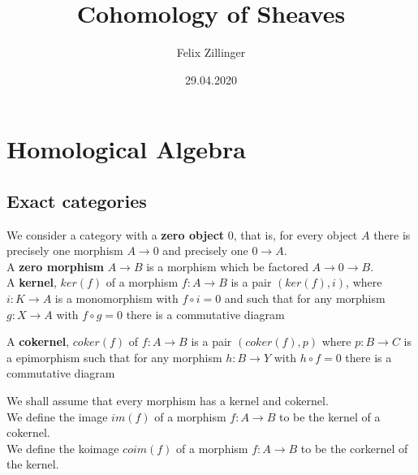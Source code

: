 \documentclass[12pt,a4paper]{article}
\author{Felix Zillinger}
\title{Cohomology of Sheaves}
\date{29.04.2020}
\theoremstyle{definition}
\theoremstyle{remark}
\begin{document}
	\maketitle 
	\tableofcontents

	\newpage	
	
	\section{Homological Algebra}
	\subsection{Exact categories}
	We consider a category with a \textbf{zero object} $0$, that is, for every object $A$ there is precisely one morphism $A \rightarrow 0$ and precisely one $0 \rightarrow A$. \\
	A \textbf{zero morphism} $A \rightarrow B$ is a morphism which be factored $A \rightarrow 0 \rightarrow B$. \\
	A \textbf{kernel}, $ker(f)$ of a morphism $f: A \rightarrow B$ is a pair $(ker(f),i)$, where $i: K \rightarrow A$ is a monomorphism with $f \circ i=0$ and such that for any morphism $g: X \rightarrow A$ with $f \circ g = 0$ there is a commutative diagram
	\begin{center}
	\end{center} 
	A \textbf{cokernel}, $coker(f)$ of $f: A \rightarrow B$ is a pair $(coker(f),p)$ where $p:B \rightarrow C$ is a epimorphism such that for any morphism $h: B \rightarrow Y$ with $h \circ f =0$ there is a commutative diagram
	\begin{center}
	\end{center}
	We shall assume that every morphism has a kernel and cokernel. \\
	We define the image $im(f)$ of a morphism $f:A \rightarrow B$ to be the kernel of a cokernel. \\
	We define the koimage $coim(f)$ of a morphism $f: A \rightarrow B$ to be the corkernel of the kernel.
\end{document}

